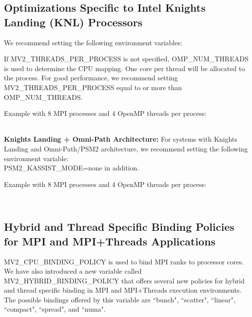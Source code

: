 \subsection{Optimizations Specific to Intel Knights Landing (KNL) Processors}
\label{sec:knl_multi_thread}

We recommend setting the following environment variables: \\

If MV2\_THREADS\_PER\_PROCESS is not specified, OMP\_NUM\_THREADS is used to
determine the CPU mapping. One core per thread will be allocated to the process.
For good performance, we recommend setting MV2\_THREADS\_PER\_PROCESS equal to or
more than \\ 
OMP\_NUM\_THREADS.

Example with 8 MPI processes and 4 OpenMP threads per process:

\\

\textbf{Knights Landing + Omni-Path Architecture:}
For systems with Knights Landing and Omni-Path/PSM2 architecture, we recommend
setting the following environment variable: \\
PSM2\_KASSIST\_MODE=none in addition.

Example with 8 MPI processes and 4 OpenMP threads per process:

\\

\subsection{Hybrid and Thread Specific Binding Policies for MPI and MPI+Threads
Applications}
\label{sec:advanced_thread_binding_policies}
MV2\_CPU\_BINDING\_POLICY is used to bind MPI ranks to processor cores. We have
also introduced a new variable called MV2\_HYBRID\_BINDING\_POLICY that offers
several new policies for hybrid and thread specific binding in MPI and MPI+Threads 
execution environments. The possible bindings offered by this variable are 
``bunch", ``scatter", ``linear", ``compact", ``spread", and ``numa". 


